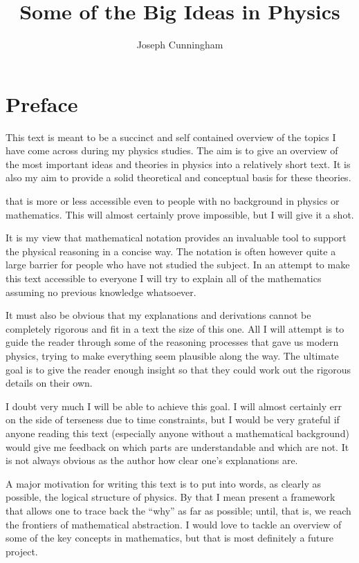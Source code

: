 \documentclass{report}
\title{Some of the Big Ideas in Physics}
\author{Joseph Cunningham}
\date{}
\begin{document}
\maketitle
\tableofcontents

\chapter{Preface}
This text is meant to be a succinct and self contained overview of the topics I have come across during my physics studies. The aim is to give an overview of the most important ideas and theories in physics into a relatively short text. It is also my aim to provide a solid theoretical and conceptual basis for these theories.  




 that is more or less accessible even to people with no background in physics or mathematics. This will almost certainly prove impossible, but I will give it a shot.

It is my view that mathematical notation provides an invaluable tool to support the physical reasoning in a concise way. The notation is often however quite a large barrier for people who have not studied the subject. In an attempt to make this text accessible to everyone I will try to explain all of the mathematics assuming no previous knowledge whatsoever.

It must also be obvious that my explanations and derivations cannot be completely rigorous and fit in a text the size of this one. All I will attempt is to guide the reader through some of the reasoning processes that gave us modern physics, trying to make everything seem plausible along the way. The ultimate goal is to give the reader enough insight so that they could work out the rigorous details on their own.

I doubt very much I will be able to achieve this goal.
I will almost certainly err on the side of terseness due to time constraints, but I would be very grateful if anyone reading this text (especially anyone without a mathematical background) would give me feedback on which parts are understandable and which are not. It is not always obvious as the author how clear one's explanations are.

A major motivation for writing this text is to put into words, as clearly as possible, the logical structure of physics. By that I mean present a framework that allows one to trace back the ``why'' as far as possible; until, that is, we reach the frontiers of mathematical abstraction. I would love to tackle an overview of some of the key concepts in mathematics, but that is most definitely a future project.
\end{document}
